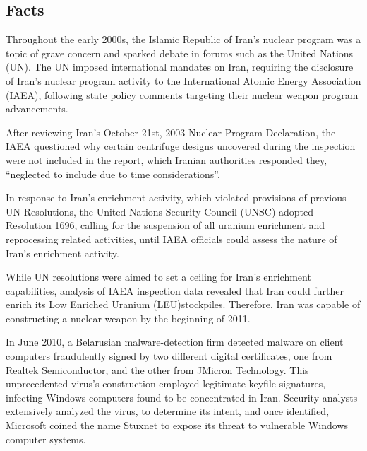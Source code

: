 \documentclass[12pt]{article}
\begin{document}
\begin{multicols}{2}

\section{Facts}

Throughout the early 2000s, the Islamic Republic of Iran's nuclear program was a topic of grave concern and sparked debate in forums such as the United Nations (UN).\cite{unitedNationsResolutions} The UN imposed international mandates on Iran, requiring the disclosure of Iran's nuclear program activity to the International Atomic Energy Association (IAEA), following state policy comments targeting their nuclear weapon program advancements. 

After reviewing Iran's October 21st, 2003 Nuclear Program Declaration, the IAEA questioned why certain centrifuge designs uncovered during the inspection were not included in the report, which Iranian authorities responded they, ``neglected to include due to time considerations''.\cite{implementationOfNPTSafeguards}

In response to Iran's enrichment activity, which violated provisions of previous UN Resolutions, the United Nations Security Council (UNSC) adopted Resolution 1696, calling for the suspension of all uranium enrichment and reprocessing related activities, until IAEA officials could assess the nature of Iran's enrichment activity.\cite{resolution1696}

While UN resolutions were aimed to set a ceiling for Iran's enrichment capabilities, analysis of IAEA inspection data revealed that Iran could further enrich its Low Enriched Uranium (LEU)\footnotemark[1] stockpiles. Therefore, Iran was capable of constructing a nuclear weapon by the beginning of 2011.\cite{hasIranAchievedaNuclearWeapon}


In June 2010, a Belarusian malware-detection firm detected malware on client computers fraudulently signed by two different digital certificates, one from Realtek Semiconductor, and the other from JMicron Technology.\cite{theRealStoryOfStuxnet} This unprecedented virus's construction employed legitimate keyfile signatures, infecting Windows computers found to be concentrated in Iran.\cite{w32.stuxnetDossier} Security analysts extensively analyzed the virus, to determine its intent, and once identified, Microsoft coined the name Stuxnet to expose its threat to vulnerable Windows computer systems.\cite{microsoftCoinsStuxnet}


\end{multicols}
\end{document}
